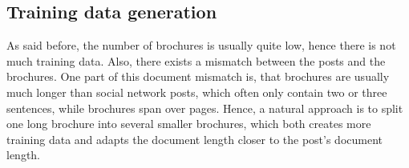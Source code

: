 
\subsection{Training data generation}

As said before, the number of brochures is usually quite low, hence there is not much training data.
Also, there exists a mismatch between the posts and the brochures.
One part of this document mismatch is, that brochures are usually much longer than social network posts, which often only contain two or three sentences, while brochures span over pages.
Hence, a natural approach is to split one long brochure into several smaller brochures, which both creates more training data and adapts the document length closer to the post's document length.

